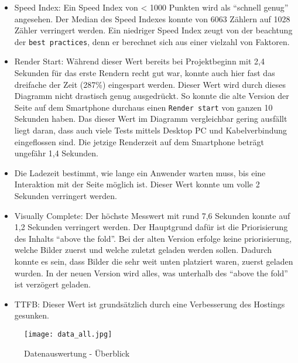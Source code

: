         \begin{itemize}
            \item Speed Index: Ein Speed Index von < 1000 Punkten wird als "`schnell genug"' angesehen. Der Median des Speed Indexes konnte von 6063 Zählern auf 1028 Zähler verringert werden. Ein niedriger Speed Index zeugt von der beachtung der \texttt{best practices}, denn er berechnet sich aus einer vielzahl von Faktoren. 
            \item Render Start: Während dieser Wert bereits bei Projektbeginn mit 2,4 Sekunden für das erste Rendern recht gut war, konnte auch hier fast das dreifache der Zeit (287\%) eingespart werden. Dieser Wert wird durch dieses Diagramm nicht drastisch genug ausgedrückt. So konnte die alte Version der Seite auf dem Smartphone durchaus einen \texttt{Render start} von ganzen 10 Sekunden haben. Das dieser Wert im Diagramm vergleichbar gering ausfällt liegt daran, dass auch viele Tests mittels Desktop PC und Kabelverbindung eingeflossen sind. Die jetzige Renderzeit auf dem Smartphone beträgt ungefähr 1,4 Sekunden. 
            \item Die Ladezeit bestimmt, wie lange ein Anwender warten muss, bis eine Interaktion mit der Seite möglich ist. Dieser Wert konnte um volle 2 Sekunden verringert werden.
            \item Visually Complete: Der höchste Messwert mit rund 7,6 Sekunden konnte auf 1,2 Sekunden verringert werden. Der Hauptgrund dafür ist die Priorisierung des Inhalts "`above the fold"'. Bei der alten Version erfolge keine priorisierung, welche Bilder zuerst und welche zuletzt geladen werden sollen. Dadurch konnte es sein, dass Bilder die sehr weit unten platziert waren, zuerst geladen wurden. In der neuen Version wird alles, was unterhalb des "`above the fold"' ist verzögert geladen.
            \item TTFB: Dieser Wert ist grundsätzlich durch eine Verbesserung des Hostings gesunken. 
        \end{itemize}

		\begin{figure}[htbp]
			\begin{center}
				\texttt{[image: data\_all.jpg]}
				\caption{Datenauswertung - Überblick }
				\label{fig:data_all}
			\end{center}
		\end{figure}

